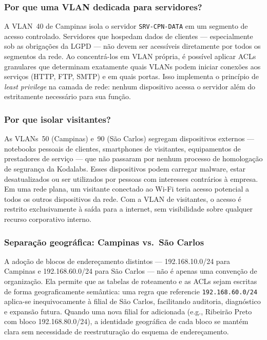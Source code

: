 \documentclass[12pt,a4paper]{article}
\begin{document}
\subsubsection{Por que uma VLAN dedicada para servidores?}

A VLAN~40 de Campinas isola o servidor \texttt{SRV-CPN-DATA} em um segmento
de acesso controlado. Servidores que hospedam dados de clientes — especialmente
sob as obrigações da LGPD — não devem ser acessíveis diretamente por todos os
segmentos da rede. Ao concentrá-los em VLAN própria, é possível aplicar ACLs
granulares que determinam exatamente quais VLANs podem iniciar conexões aos
serviços (HTTP, FTP, SMTP) e em quais portas. Isso implementa o princípio de
\textit{least privilege} na camada de rede: nenhum dispositivo acessa o servidor
além do estritamente necessário para sua função.

\subsubsection{Por que isolar visitantes?}

As VLANs~50 (Campinas) e~90 (São Carlos) segregam dispositivos externos —
notebooks pessoais de clientes, smartphones de visitantes, equipamentos de
prestadores de serviço — que não passaram por nenhum processo de homologação de
segurança da Kodalabs. Esses dispositivos podem carregar malware, estar
desatualizados ou ser utilizados por pessoas com interesses contrários à empresa.
Em uma rede plana, um visitante conectado ao Wi-Fi teria acesso potencial a todos
os outros dispositivos da rede. Com a VLAN de visitantes, o acesso é restrito
exclusivamente à saída para a internet, sem visibilidade sobre qualquer recurso
corporativo interno.

\subsubsection{Separação geográfica: Campinas vs.\ São Carlos}

A adoção de blocos de endereçamento distintos — 192.168.10.0/24 para Campinas e
192.168.60.0/24 para São Carlos — não é apenas uma convenção de organização. Ela
permite que as tabelas de roteamento e as ACLs sejam escritas de forma
geograficamente semântica: uma regra que referencie \texttt{192.168.60.0/24}
aplica-se inequivocamente à filial de São Carlos, facilitando auditoria, diagnóstico
e expansão futura. Quando uma nova filial for adicionada (e.g., Ribeirão Preto com
bloco 192.168.80.0/24), a identidade geográfica de cada bloco se mantém clara sem
necessidade de reestruturação do esquema de endereçamento.
\end{document}
